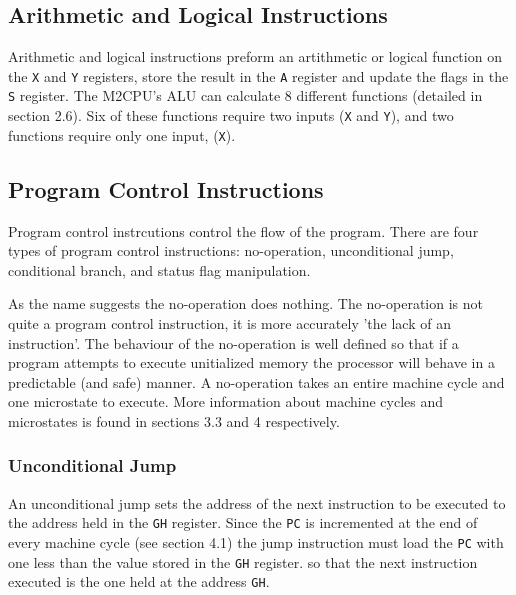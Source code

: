 \documentclass[a4paper,12pt]{article}
\newcommand{\mt}{M2CPU}
\newcommand{\Ar}{\texttt{A}}
\newcommand{\Gr}{\texttt{G}}
\newcommand{\Hr}{\texttt{H}}
\newcommand{\Xr}{\texttt{X}}
\newcommand{\Yr}{\texttt{Y}}
\newcommand{\Sr}{\texttt{S}}
\newcommand{\PC}{\texttt{PC}}
\begin{document}
\subsection{Arithmetic and Logical Instructions}
Arithmetic and logical instructions preform an artithmetic or logical function
on the \Xr{} and \Yr{} registers, store the result in the \Ar{} register and 
update the flags in the \Sr{} register. The \mt{}'s ALU can calculate 8 
different functions (detailed in section 2.6). Six of these functions require
two inputs (\Xr{} and \Yr{}), and two functions require only one input, (\Xr{}).
\par

\subsection{Program Control Instructions}
Program control instrcutions control the flow of the program. There are four
types of program control instructions: no-operation, unconditional jump,
conditional branch, and status flag manipulation.
\par

As the name suggests the no-operation does nothing. The no-operation is not 
quite a program control instruction, it is more accurately 'the lack of an 
instruction'. The behaviour of the no-operation is well defined so that if a 
program attempts to execute unitialized memory the processor will behave in a 
predictable (and safe) manner. A no-operation takes an entire machine cycle and
one microstate to execute. More information about machine cycles and 
microstates is found in sections 3.3 and 4 respectively.
\par

\subsubsection{Unconditional Jump}
An unconditional jump sets the address of the next instruction to be executed
to the address held in the \Gr{}\Hr{} register. Since the \PC{} is incremented
at the end of every machine cycle (see section 4.1) the jump instruction must
load the \PC{} with one less than the value stored in the \Gr{}\Hr{} register.
so that the next instruction executed is the one held at the address 
\Gr{}\Hr{}.
\par
\end{document}
